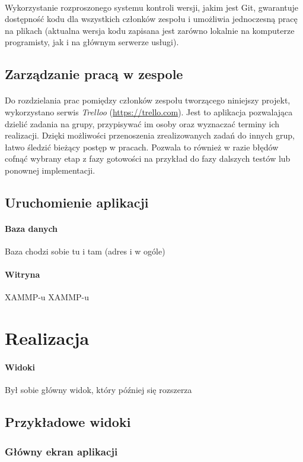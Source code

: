 \documentclass[a4paper, 12pt, oneside]{article}
\begin{document}
			\paragraph{} Wykorzystanie rozproszonego systemu kontroli wersji, jakim jest Git, gwarantuje dostępność kodu dla wszystkich członków zespołu i umożliwia jednoczesną pracę na plikach (aktualna wersja kodu zapisana jest zarówno lokalnie na komputerze programisty, jak i na głównym serwerze usługi).
			\subsection{Zarządzanie pracą w zespole}
			\paragraph{}Do rozdzielania prac pomiędzy członków zespołu tworzącego niniejszy projekt, wykorzystano serwis \textit{Trelloo} (\url{https://trello.com}). Jest to aplikacja pozwalająca dzielić zadania na grupy, przypisywać im osoby oraz wyznaczać terminy ich realizacji. Dzięki możliwości przenoszenia zrealizowanych zadań do innych grup, łatwo śledzić bieżący postęp w pracach. Pozwala to również w razie błędów cofnąć wybrany etap z fazy gotowości na przykład do fazy dalszych testów lub ponownej implementacji. 
		\subsection{Uruchomienie aplikacji}
			\paragraph{Baza danych}
				Baza chodzi sobie tu i tam (adres i w ogóle)
			\paragraph{Witryna}
				XAMMP-u XAMMP-u
\section{Realizacja}
	\paragraph{Widoki}
		Był sobie główny widok, który później się rozszerza
		\subsection{Przykładowe widoki}
			\subsubsection{Główny ekran aplikacji}
\end{document}
